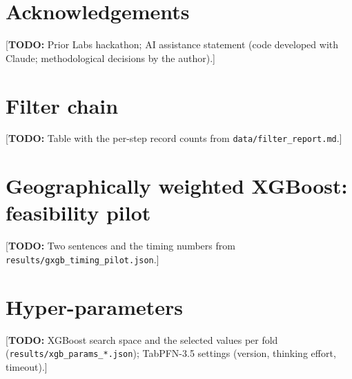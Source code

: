 \documentclass[11pt,a4paper]{article}
\newcommand{\todo}[1]{\textcolor{red!70!black}{[\textbf{TODO:} #1]}}
\begin{document}
\section*{Acknowledgements}
\todo{Prior Labs hackathon; AI assistance statement (code developed with Claude; methodological
decisions by the author).}




\appendix
\section{Filter chain}
\label{app:filters}
\todo{Table with the per-step record counts from \texttt{data/filter\_report.md}.}

\section{Geographically weighted XGBoost: feasibility pilot}
\label{app:gxgb}
\todo{Two sentences and the timing numbers from \texttt{results/gxgb\_timing\_pilot.json}.}

\section{Hyper-parameters}
\label{app:hparams}
\todo{XGBoost search space and the selected values per fold (\texttt{results/xgb\_params\_*.json});
TabPFN-3.5 settings (version, thinking effort, timeout).}
\end{document}
